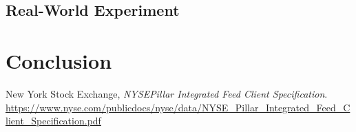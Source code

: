 \documentclass[11pt]{article}
\begin{document}
\subsection{Real-World Experiment}

\section{Conclusion}



\pagebreak

\begin{thebibliography}{1}
     New York Stock Exchange, \emph{NYSEPillar Integrated Feed Client Specification}.
    \url{https://www.nyse.com/publicdocs/nyse/data/NYSE_Pillar_Integrated_Feed_Client_Specification.pdf}
\end{thebibliography}
\end{document}
